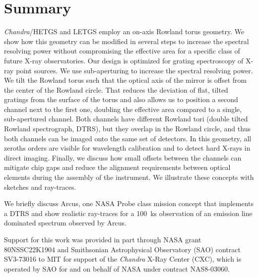 \documentclass[twocolumn]{aastex631}
\begin{document}
\section{Summary}
\label{sect:summary}
\emph{Chandra}/HETGS and LETGS employ an on-axis Rowland torus geometry. We show how this geometry can be modified in several steps to increase the spectral resolving power without compromising the effective area for a specific class of future X-ray observatories. Our design is optimized for grating spectroscopy of X-ray point sources. We use sub-aperturing to increase the spectral resolving power. We tilt the Rowland torus such that the optical axis of the mirror is offset from the center of the Rowland circle. That reduces the deviation of flat, tilted gratings from the surface of the torus and also allows us to position a second channel next to the first one, doubling the effective area compared to a single, sub-apertured channel. Both channels have different Rowland tori (double tilted Rowland spectrograph, DTRS), but they overlap in the Rowland circle, and thus both channels can be imaged onto the same set of detectors. In this geometry, all zeroths orders are visible for wavelength calibration and to detect hard X-rays in direct imaging. Finally, we discuss how small offsets between the channels can mitigate chip gaps and reduce the alignment requirements between optical elements during the assembly of the instrument. We illustrate these concepts with sketches and ray-traces.

We briefly discuss Arcus, one NASA Probe class mission concept that implements a DTRS and show realistic ray-traces for a 100~ks observation of an emission line dominated spectrum observed by Arcus.


\begin{acknowledgements}
Support for this work was provided in part through NASA grant 80NSSC22K1904 and Smithsonian Astrophysical Observatory (SAO)
contract SV3-73016 to MIT for support of the {\em Chandra} X-Ray Center (CXC),
which is operated by SAO for and on behalf of NASA under contract NAS8-03060.
\end{acknowledgements}


{}



\end{document}
